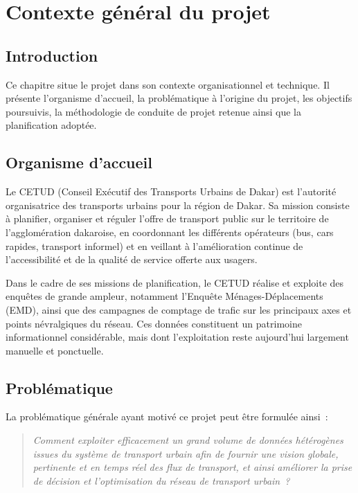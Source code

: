 \chapter{Contexte général du projet}
\label{ch:contexte}

\section{Introduction}
Ce chapitre situe le projet dans son contexte organisationnel et technique. Il présente l'organisme d'accueil, la problématique à l'origine du projet, les objectifs poursuivis, la méthodologie de conduite de projet retenue ainsi que la planification adoptée.

\section{Organisme d'accueil}
Le CETUD (Conseil Exécutif des Transports Urbains de Dakar) est l'autorité organisatrice des transports urbains pour la région de Dakar. Sa mission consiste à planifier, organiser et réguler l'offre de transport public sur le territoire de l'agglomération dakaroise, en coordonnant les différents opérateurs (bus, cars rapides, transport informel) et en veillant à l'amélioration continue de l'accessibilité et de la qualité de service offerte aux usagers.

Dans le cadre de ses missions de planification, le CETUD réalise et exploite des enquêtes de grande ampleur, notamment l'Enquête Ménages-Déplacements (EMD), ainsi que des campagnes de comptage de trafic sur les principaux axes et points névralgiques du réseau. Ces données constituent un patrimoine informationnel considérable, mais dont l'exploitation reste aujourd'hui largement manuelle et ponctuelle.

\section{Problématique}
La problématique générale ayant motivé ce projet peut être formulée ainsi~:

\begin{quote}
\textit{Comment exploiter efficacement un grand volume de données hétérogènes issues du système de transport urbain afin de fournir une vision globale, pertinente et en temps réel des flux de transport, et ainsi améliorer la prise de décision et l'optimisation du réseau de transport urbain~?}
\end{quote}

